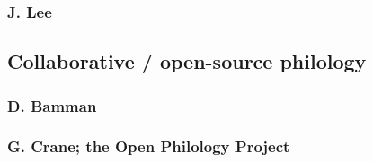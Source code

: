 \subsubsection{J. Lee}
\cite{lee2008nearest,conf/lrec/LeeH10}

\subsection{Collaborative / open-source philology}

\subsubsection{D. Bamman}
\cite{bammanpbml2008,bammantlt8,Bamman:2008:BDL:1378889.1378892,bammandhq2009,springerlink:10.1007/978-3-642-20227-8_5}

\subsubsection{G. Crane; the Open Philology Project}





